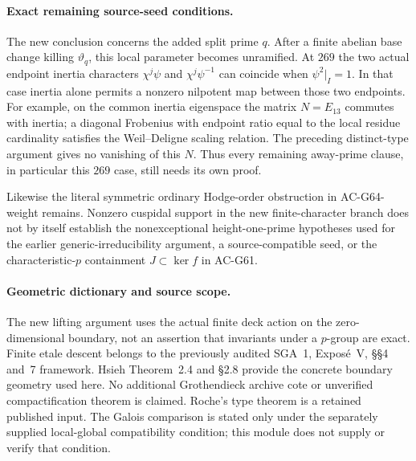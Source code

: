 \paragraph{Exact remaining source-seed conditions.}
The new conclusion concerns the added split prime $q$.
After a finite abelian base change killing $\vartheta_q$,
this local parameter becomes unramified.  At $269$ the two
actual endpoint inertia characters
$\chi^j\psi$ and $\chi^j\psi^{-1}$ can coincide when
$\psi^2|_I=1$.  In that case inertia alone permits a nonzero
nilpotent map between those two endpoints.  For example,
on the common inertia eigenspace the matrix $N=E_{13}$
commutes with inertia; a diagonal Frobenius with endpoint
ratio equal to the local residue cardinality satisfies the
Weil--Deligne scaling relation.  The preceding distinct-type
argument gives no vanishing of this $N$.  Thus every
remaining away-prime  clause, in particular
this $269$ case, still needs its own proof.

Likewise the literal symmetric ordinary Hodge-order
obstruction in AC-G64-weight remains.  Nonzero cuspidal
support in the new finite-character branch does not by
itself establish the nonexceptional height-one-prime
hypotheses used for the earlier generic-irreducibility
argument, a source-compatible seed, or the characteristic-$p$
containment $J\subset\ker f$ in AC-G61.

\paragraph{Geometric dictionary and source scope.}
The new lifting argument uses the actual finite deck action
on the zero-dimensional boundary, not an assertion that
invariants under a $p$-group are exact.  Finite etale descent
belongs to the previously audited SGA~1, Expos\'e~V,
\S\S4 and~7 framework.  Hsieh Theorem~2.4 and \S2.8 provide
the concrete boundary geometry used here.  No additional
Grothendieck archive cote or unverified compactification
theorem is claimed.  Roche's type theorem is a retained
published input.  The Galois comparison is stated only under
the separately supplied local-global compatibility condition;
this module does not supply or verify that condition.
